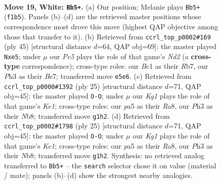 \documentclass[11pt]{article}
\begin{document}
\clearpage

\begin{figure}[p]\centering
\begin{subfigure}{0.46\textwidth}\centering
\resizebox{\linewidth}{!}{%
\newchessgame
\chessboard[
  setfen={r1b1kbnr/4q3/8/p1p1Pp2/3p1p1p/NP5P/P5P1/R1BQ1BKR w kq - 0 19},
  showmover=false,
  pgfstyle=straightmove, color=movearrow, markmove={f1-b5}
]}
\caption{}
\end{subfigure}\hfill
\begin{subfigure}{0.46\textwidth}\centering
\resizebox{\linewidth}{!}{%
\newchessgame
\chessboard[
  setfen={2b1r1k1/1rqnbp1p/p3p1pB/2p1P3/2P1N3/4Q2P/PPR3P1/3R1BK1 b - - 0 23},
  showmover=false,
  pgfstyle=straightmove, color=movearrow, markmove={d7-e5}
]}
\caption{}
\end{subfigure}
\\[4pt]
\begin{subfigure}{0.46\textwidth}\centering
\resizebox{\linewidth}{!}{%
\newchessgame
\chessboard[
  setfen={rn1qk2r/1p2bpp1/3p4/p2Ppb1p/P7/1N2BP2/1PPQB1PP/R3K2R b KQkq - 0 13},
  showmover=false,
  pgfstyle=straightmove, color=movearrow, markmove={e8-g8}
]}
\caption{}
\end{subfigure}\hfill
\begin{subfigure}{0.46\textwidth}\centering
\resizebox{\linewidth}{!}{%
\newchessgame
\chessboard[
  setfen={rn1qk2r/1p2bpp1/3p4/p2Ppb1p/P7/1N2BP2/1PPQB1PP/R3K2R b KQkq - 0 13},
  showmover=false,
  pgfstyle=straightmove, color=movearrow, markmove={e8-g8}
]}
\caption{}
\end{subfigure}
\caption{\textbf{Move 19, White: \texttt{Bb5+}.} (a) Our position; Melanie plays \texttt{Bb5+} (\texttt{f1b5}). Panels (b)--(d) are the retrieved master positions whose correspondence most drove this move (highest QAP objective among those that transfer to it). (b) Retrieved from \texttt{ccrl\_top\_p0002\#169} (ply 45) [structural distance $d$=64, QAP obj=69]: the master played \texttt{Nxe5}; under $\mu$ our \emph{Pe5} plays the role of that game's \emph{Nd2} (a \textbf{cross-type} correspondence); cross-type roles: our \emph{B}c1 as their \emph{R}b7, our \emph{P}h3 as their \emph{B}e7; transferred move \texttt{e5e6}. (c) Retrieved from \texttt{ccrl\_top\_p0000\#1392} (ply 25) [structural distance $d$=71, QAP obj=45]: the master played \texttt{O-O}; under $\mu$ our \emph{Kg1} plays the role of that game's \emph{Ke1}; cross-type roles: our \emph{p}a5 as their \emph{R}a8, our \emph{P}h3 as their \emph{N}b8; transferred move \texttt{g1h2}. (d) Retrieved from \texttt{ccrl\_top\_p0002\#1798} (ply 25) [structural distance $d$=71, QAP obj=45]: the master played \texttt{O-O}; under $\mu$ our \emph{Kg1} plays the role of that game's \emph{Ke1}; cross-type roles: our \emph{p}a5 as their \emph{R}a8, our \emph{P}h3 as their \emph{N}b8; transferred move \texttt{g1h2}. Synthesis: no retrieved analog transferred to \texttt{Bb5+} -- the \texttt{search} selector chose it on value (material / mate); panels (b)--(d) show the strongest nearby analogies.}
\label{fig:thought-m36}
\end{figure}
\end{document}
